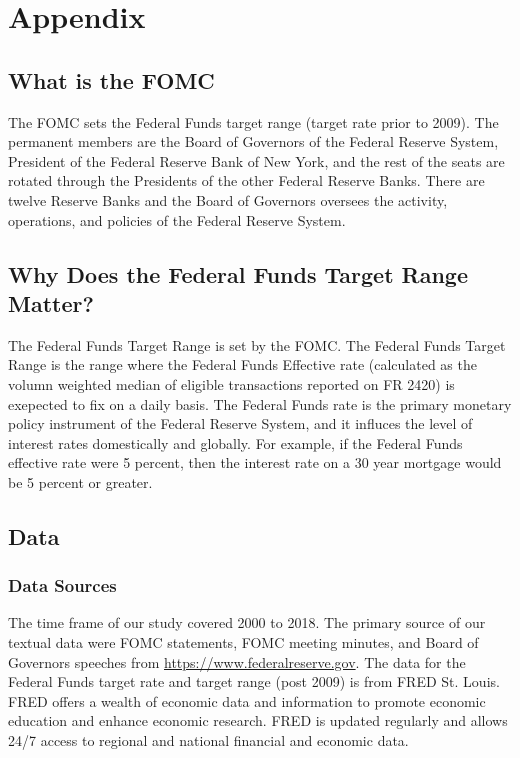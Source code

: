 \documentclass[11pt]{article}
\begin{document}
{\appendix
\section{Appendix}

\subsection{What is the FOMC}

The FOMC sets the Federal Funds target range (target rate prior to 2009).  The permanent members are the Board of Governors of the Federal Reserve System, President of the Federal Reserve Bank of New York, and the rest of the seats are rotated through the Presidents of the other Federal Reserve Banks.  There are twelve Reserve Banks and the Board of Governors oversees the activity, operations, and policies of the Federal Reserve System.   

\subsection{Why Does the Federal Funds Target Range Matter?}

The Federal Funds Target Range is set by the FOMC.  The Federal Funds Target Range is the range where the Federal Funds Effective rate (calculated as the volumn weighted median of eligible transactions reported on FR 2420) is exepected to fix on a daily basis.  The Federal Funds rate is the primary monetary policy instrument of the Federal Reserve System, and it influces the level of interest rates domestically and globally.  For example, if the Federal Funds effective rate were 5 percent, then the interest rate on a 30 year mortgage would be 5 percent or greater.  

\subsection{Data}

\subsubsection{Data Sources}
The time frame of our study covered 2000 to 2018.  
The primary source of our textual data were FOMC statements, FOMC meeting minutes, and Board of Governors speeches from \url{https://www.federalreserve.gov}.  
The data for the Federal Funds target rate and target range (post 2009) is from FRED St. Louis.  
FRED offers a wealth of economic data and information to promote economic education and enhance economic research. 
FRED is updated regularly and allows 24/7 access to regional and national financial and economic data.


}
\end{document}
